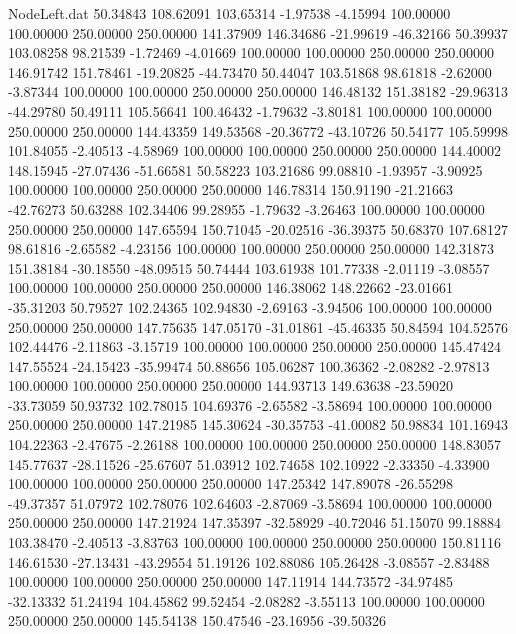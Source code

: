 \begin{filecontents}{NodeLeft.dat}
  50.34843  108.62091  103.65314    -1.97538   -4.15994  100.00000  100.00000  250.00000  250.00000  141.37909  146.34686  -21.99619  -46.32166
  50.39937  103.08258   98.21539    -1.72469   -4.01669  100.00000  100.00000  250.00000  250.00000  146.91742  151.78461  -19.20825  -44.73470
  50.44047  103.51868   98.61818    -2.62000   -3.87344  100.00000  100.00000  250.00000  250.00000  146.48132  151.38182  -29.96313  -44.29780
  50.49111  105.56641  100.46432    -1.79632   -3.80181  100.00000  100.00000  250.00000  250.00000  144.43359  149.53568  -20.36772  -43.10726
  50.54177  105.59998  101.84055    -2.40513   -4.58969  100.00000  100.00000  250.00000  250.00000  144.40002  148.15945  -27.07436  -51.66581
  50.58223  103.21686   99.08810    -1.93957   -3.90925  100.00000  100.00000  250.00000  250.00000  146.78314  150.91190  -21.21663  -42.76273
  50.63288  102.34406   99.28955    -1.79632   -3.26463  100.00000  100.00000  250.00000  250.00000  147.65594  150.71045  -20.02516  -36.39375
  50.68370  107.68127   98.61816    -2.65582   -4.23156  100.00000  100.00000  250.00000  250.00000  142.31873  151.38184  -30.18550  -48.09515
  50.74444  103.61938  101.77338    -2.01119   -3.08557  100.00000  100.00000  250.00000  250.00000  146.38062  148.22662  -23.01661  -35.31203
  50.79527  102.24365  102.94830    -2.69163   -3.94506  100.00000  100.00000  250.00000  250.00000  147.75635  147.05170  -31.01861  -45.46335
  50.84594  104.52576  102.44476    -2.11863   -3.15719  100.00000  100.00000  250.00000  250.00000  145.47424  147.55524  -24.15423  -35.99474
  50.88656  105.06287  100.36362    -2.08282   -2.97813  100.00000  100.00000  250.00000  250.00000  144.93713  149.63638  -23.59020  -33.73059
  50.93732  102.78015  104.69376    -2.65582   -3.58694  100.00000  100.00000  250.00000  250.00000  147.21985  145.30624  -30.35753  -41.00082
  50.98834  101.16943  104.22363    -2.47675   -2.26188  100.00000  100.00000  250.00000  250.00000  148.83057  145.77637  -28.11526  -25.67607
  51.03912  102.74658  102.10922    -2.33350   -4.33900  100.00000  100.00000  250.00000  250.00000  147.25342  147.89078  -26.55298  -49.37357
  51.07972  102.78076  102.64603    -2.87069   -3.58694  100.00000  100.00000  250.00000  250.00000  147.21924  147.35397  -32.58929  -40.72046
  51.15070   99.18884  103.38470    -2.40513   -3.83763  100.00000  100.00000  250.00000  250.00000  150.81116  146.61530  -27.13431  -43.29554
  51.19126  102.88086  105.26428    -3.08557   -2.83488  100.00000  100.00000  250.00000  250.00000  147.11914  144.73572  -34.97485  -32.13332
  51.24194  104.45862   99.52454    -2.08282   -3.55113  100.00000  100.00000  250.00000  250.00000  145.54138  150.47546  -23.16956  -39.50326

\end{filecontents}
